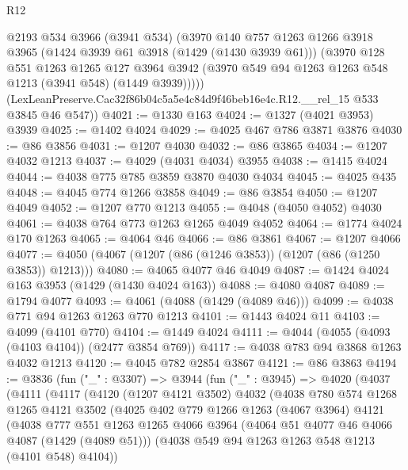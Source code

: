 \begin{lexlean}{R12}
\begin{coremodule}
        @2193
        @534
        @3966
        (@3941 @534)
        (@3970
          @140
          @757
          @1263
          @1266
          @3918
          @3965
          (@1424 @3939 @61 @3918 (@1429 (@1430 @3939 @61)))
          (@3970
            @128
            @551
            @1263
            @1265
            @127
            @3964
            @3942
            (@3970 @549 @94 @1263 @1263 @548 @1213 (@3941 @548) (@1449 @3939)))))
      (LexLeanPreserve.Cac32f86b04c5a5e4c84d9f46beb16e4c.R12.__rel_15 @533 @3845 @46 @547))
@4021 := @1330 @163
@4024 := @1327 (@4021 @3953) @3939
@4025 := @1402 @4024
@4029 := @4025 @467 @786 @3871 @3876
@4030 := @86 @3856
@4031 := @1207 @4030
@4032 := @86 @3865
@4034 := @1207 @4032 @1213
@4037 := @4029 (@4031 @4034) @3955
@4038 := @1415 @4024
@4044 := @4038 @775 @785 @3859 @3870 @4030 @4034
@4045 := @4025 @435
@4048 := @4045 @774 @1266 @3858
@4049 := @86 @3854
@4050 := @1207 @4049
@4052 := @1207 @770 @1213
@4055 := @4048 (@4050 @4052) @4030
@4061 := @4038 @764 @773 @1263 @1265 @4049 @4052
@4064 := @1774 @4024 @170 @1263
@4065 := @4064 @46
@4066 := @86 @3861
@4067 := @1207 @4066
@4077 := @4050 (@4067 (@1207 (@86 (@1246 @3853)) (@1207 (@86 (@1250 @3853)) @1213)))
@4080 := @4065 @4077 @46 @4049
@4087 := @1424 @4024 @163 @3953 (@1429 (@1430 @4024 @163))
@4088 := @4080 @4087
@4089 := @1794 @4077
@4093 := @4061 (@4088 (@1429 (@4089 @46)))
@4099 := @4038 @771 @94 @1263 @1263 @770 @1213
@4101 := @1443 @4024 @11
@4103 := @4099 (@4101 @770)
@4104 := @1449 @4024
@4111 := @4044 (@4055 (@4093 (@4103 @4104)) (@2477 @3854 @769))
@4117 := @4038 @783 @94 @3868 @1263 @4032 @1213
@4120 := @4045 @782 @2854 @3867
@4121 := @86 @3863
@4194 := @3836
    (fun ("_" : @3307) =>
    @3944
      (fun ("_" : @3945) =>
      @4020
        (@4037
          (@4111
            (@4117
              (@4120
                (@1207 @4121 @3502)
                @4032
                (@4038
                  @780
                  @574
                  @1268
                  @1265
                  @4121
                  @3502
                  (@4025
                    @402
                    @779
                    @1266
                    @1263
                    (@4067 @3964)
                    @4121
                    (@4038
                      @777
                      @551
                      @1263
                      @1265
                      @4066
                      @3964
                      (@4064 @51 @4077 @46 @4066 @4087 (@1429 (@4089 @51)))
                      (@4038 @549 @94 @1263 @1263 @548 @1213 (@4101 @548) @4104))

\end{coremodule}
\end{lexlean}
